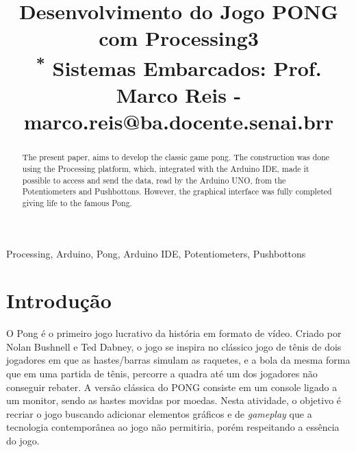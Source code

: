 \documentclass[conference]{IEEEtran}
\begin{document}
\title{Desenvolvimento do Jogo PONG com Processing3\\
{\footnotesize \textsuperscript{*} Sistemas Embarcados: Prof. Marco Reis - marco.reis@ba.docente.senai.brr}
}




\author{
\and
{}
\and
{}
}

\maketitle

\begin{abstract}
The present paper, aims to develop the classic game pong. The construction was done using the Processing platform, which, integrated with the Arduino IDE, made it possible to access and send the data, read by the Arduino UNO, from the Potentiometers and Pushbottons. However, the graphical interface was fully completed giving life to the famous Pong.
\end{abstract}

\begin{IEEEkeywords}
Processing, Arduino, Pong, Arduino IDE, Potentiometers, Pushbottons
\end{IEEEkeywords}

\section{Introdução}
O Pong é o primeiro jogo lucrativo da história em formato de vídeo. Criado por  Nolan Bushnell e Ted Dabney, o jogo se inspira no clássico jogo de tênis de dois jogadores em que as hastes/barras simulam as raquetes, e a bola da mesma forma que em uma partida de tênis, percorre a quadra até um dos jogadores não conseguir rebater\cite{TechTudo}. A versão clássica do PONG consiste em um console ligado a um monitor, sendo as hastes movidas por moedas. Nesta atividade, o objetivo é recriar o jogo buscando adicionar elementos gráficos e de \textit{gameplay} que a tecnologia contemporânea ao jogo não permitiria, porém respeitando a essência do jogo.
\end{document}
